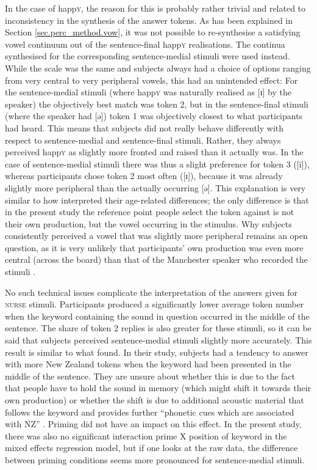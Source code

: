 In the case of happ\textsc{y}, the reason for this is probably rather trivial and related to inconsistency in the synthesis of the answer tokens.
As has been explained in Section \ref{sec.perc_method.vow}, it was not possible to re-synthesise a satisfying vowel continuum out of the sentence-final happ\textsc{y} realisations.
The continua synthesised for the corresponding sentence-medial stimuli were used instead.
While the scale was the same and subjects always had a choice of options ranging from very central to very peripheral vowels, this had an unintended effect: For the sentence-medial stimuli (where happ\textsc{y} was naturally realised as [ɪ] by the speaker) the objectively best match was token 2, but in the sentence-final stimuli (where the speaker had [ə]) token 1 was objectively closest to what participants had heard.
This means that subjects did not really behave differently with respect to sentence-medial and sentence-final stimuli.
Rather, they always perceived happ\textsc{y} as slightly more fronted and raised than it actually was.
In the case of sentence-medial stimuli there was thus a slight preference for token 3 ([ï]), whereas participants chose token 2 most often ([ɪ]), because it was already slightly more peripheral than the actually occurring [ə].
This explanation is very similar to how \textcite[878--879; see also above]{haydrager2010} interpreted their age-related differences; the only difference is that in the present study the reference point people select the token against is not their own production, but the vowel occurring in the stimulus.
Why subjects consistently perceived a vowel that was slightly more peripheral remains an open question, as it is very unlikely that participants' own production was even more central (across the board) than that of the Manchester speaker who recorded the stimuli \parencite[cf.][878--879]{haydrager2010}.

No such technical issues complicate the interpretation of the answers given for \textsc{nurse} stimuli.
Participants produced a significantly lower average token number when the keyword containing the sound in question occurred in the middle of the sentence.
The share of token 2 replies is also greater for these stimuli, so it can be said that subjects perceived sentence-medial stimuli slightly more accurately.
This result is similar to what \textcite{hayetal2006a} found.
In their study, subjects had a tendency to answer with more New Zealand tokens when the keyword had been presented in the middle of the sentence.
They are unsure about whether this is due to the fact that people have to hold the sound in memory (which might shift it towards their own production) or whether the shift is due to additional acoustic material that follows the keyword and provides further ``phonetic cues which are associated with NZ'' \parencite[365]{hayetal2006a}.
Priming did not have an impact on this effect.
In the present study, there was also no significant interaction prime X position of keyword in the mixed effects regression model, but if one looks at the raw data, the difference between priming conditions seems more pronounced for sentence-medial stimuli.

